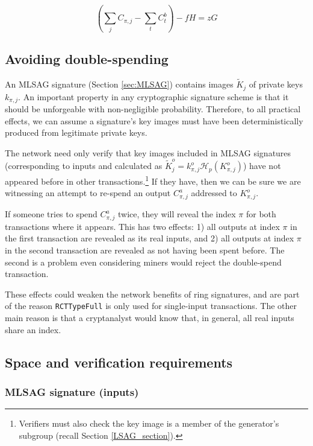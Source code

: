 \[ (\sum\limits_j C_{\pi, j} - \sum\limits_t C^b_{t}) - f H = z G\]


\subsection{Avoiding double-spending}

An MLSAG signature (Section \ref{sec:MLSAG}) contains images \(\tilde{K}_{j}\) of private keys \(k_{\pi, j}\). An important property in any cryptographic signature scheme is that it should be unforgeable with non-negligible probability. Therefore, to all practical effects, we can assume a signature’s key images must have been deterministically produced from legitimate private keys.
	
The network need only verify that key images included in MLSAG signatures (corresponding to inputs and calculated as $\tilde{K}^o_{j} = k^o_{\pi,j} \mathcal{H}_p(K^o_{\pi,j})$) have not appeared before in other transactions.\footnote{Verifiers must also check the key image is a member of the generator's subgroup (recall Section \ref{LSAG_section}).} If they have, then we can be sure we are witnessing an attempt to re-spend an output $C^a_{\pi,j}$ addressed to $K_{\pi,j}^o$.

If someone tries to spend $C^a_{\pi,j}$ twice, they will reveal the index $\pi$ for both transactions where it appears. This has two effects: 1) all outputs at index $\pi$ in the first transaction are revealed as its real inputs, and 2) all outputs at index $\pi$ in the second transaction are revealed as not having been spent before. The second is a problem even considering miners would reject the double-spend transaction.

These effects could weaken the network benefits of ring signatures, and are part of the reason {\tt RCTTypeFull} is only used for single-input transactions. The other main reason is that a cryptanalyst would know that, in general, all real inputs share an index.


\subsection{Space and verification requirements}
\label{subsec:space-and-ver-rcttypefull}

\subsubsection*{MLSAG signature (inputs)}

